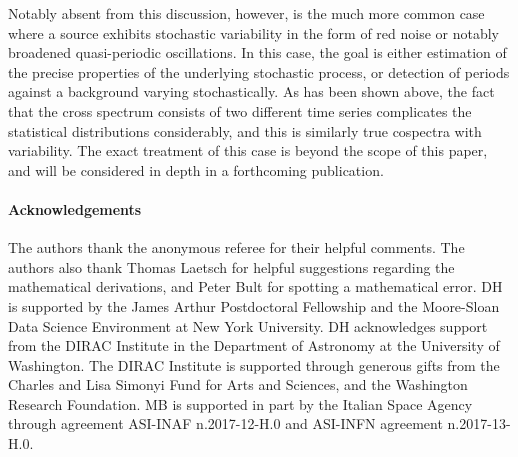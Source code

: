 \documentclass[12pt]{emulateapj}
\begin{document}
Notably absent from this discussion, however, is the much more common case where a source exhibits stochastic variability in the form of red noise or notably broadened quasi-periodic oscillations. In this case, the goal is either estimation of the precise properties of the underlying stochastic process, or detection of periods against a background varying stochastically. As has been shown above, the fact that the cross spectrum consists of two different time series complicates the statistical distributions considerably, and this is similarly true cospectra with variability. The exact treatment of this case is beyond the scope of this paper, and will be considered in depth in a forthcoming publication. 


\paragraph{Acknowledgements}
The authors thank the anonymous referee for their helpful comments.
The authors also thank Thomas Laetsch for helpful suggestions regarding the mathematical derivations, and Peter Bult for spotting a mathematical error.
DH is supported by the James Arthur Postdoctoral Fellowship and the Moore-Sloan Data Science Environment at New York University. 
DH acknowledges support from the DIRAC Institute in the Department of Astronomy at the University of Washington. The DIRAC Institute is supported through generous gifts from the Charles and Lisa Simonyi Fund for Arts and Sciences, and the Washington Research Foundation.
MB is supported in part by the Italian Space Agency through agreement ASI-INAF n.2017-12-H.0 and ASI-INFN agreement n.2017-13-H.0.







\end{document}
